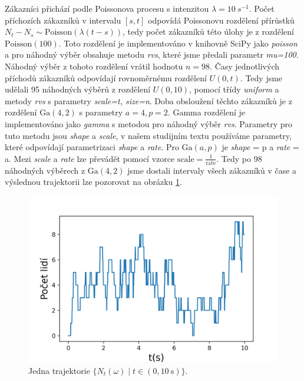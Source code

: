 \documentclass[czech]{mvi-report}
\begin{document}
Zákazníci přichází podle Poissonova procesu s intenzitou $ \lambda = 10~s^{-1} $. Počet příchozích zákazníků v intervalu $ [s,t] $ odpovídá Poissonovu rozdělení přírůstků $ N_t - N_s \sim \textrm{Poisson}(\lambda (t-s)) $, tedy počet zákazníků této úlohy je z rozdělení $ \textrm{Poisson}(100) $. Toto rozdělení je implementováno v knihovně SciPy jako \textit{poisson} a pro náhodný výběr obsahuje metodu \textit{rvs}, které jsme předali parametr \textit{mu=100}. Náhodný výběr z tohoto rozdělení vrátil hodnotu $  n=98 $. Časy jednotlivých příchodů zákazníků odpovídají rovnoměrnému rozdělení $ U(0,t) $. Tedy jsme udělali 95 náhodných výběrů z rozdělení $ U(0,10) $, pomocí třídy \textit{uniform} a metody \textit{rvs} s parametry \textit{scale=t, size=n}. Doba obsloužení těchto zákazníků je z rozdělení $\mathrm{Ga}(4,2)$ s parametry $ a = 4, p = 2 $. Gamma rozdělení je implementováno jako \textit{gamma} s metodou pro náhodný výběr \textit{rvs}. Parametry pro tuto metodu jsou \textit{shape} a \textit{scale}, v našem studijním textu používáme parametry, které odpovídají parametrizaci \textit{shape} a \textit{rate}. Pro $ \mathrm{Ga}(a,p) $ je \textit{shape} = p a \textit{rate} = a. Mezi \textit{scale} a \textit{rate} lze převádět pomocí vzorce $\mathrm{scale}=\frac{1}{\mathrm{rate}} $. Tedy po 98 náhodných výběrech z $\mathrm{Ga}(4,2)$ jsme dostali intervaly všech zákazníků v čase a výslednou trajektorii lze pozorovat na obrázku \ref{fig:traj}.

\begin{figure}
\includegraphics[width=\columnwidth]{img/traj.png} 
\caption{Jedna trajektorie $ \{N_t(\omega) \mid t\in(0,10~\mathrm{s})\} $.}
\label{fig:traj}
\end{figure}
\end{document}
